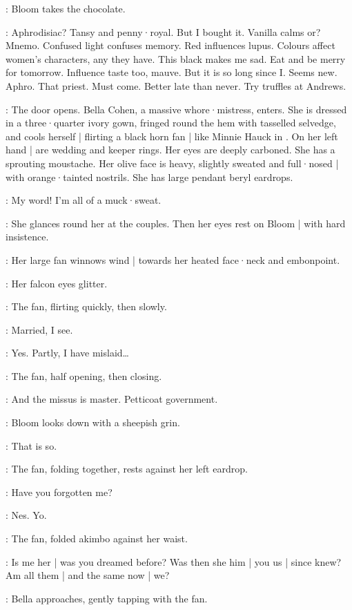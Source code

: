 :
Bloom takes the chocolate.

\Bloom:
Aphrodisiac?
Tansy and penny·royal.
But I bought it.
Vanilla calms or?
Mnemo.
Confused light confuses memory.
Red influences lupus.
Colours affect women's characters,
any they have.
This black makes me sad.
Eat and be merry for tomorrow.
Influence taste too,
mauve.
But it is so long since I\@.
Seems new.
Aphro.
That priest.
%
Must come.
Better late than never.
Try truffles at Andrews.

:
The door opens.
Bella Cohen,
a massive whore·mistress,
enters.
She is dressed in a three·quarter ivory gown,
fringed round the hem with tasselled selvedge,
and cools herself |
flirting a black horn fan |
like Minnie Hauck in .
On her left hand |
are wedding and keeper rings.
Her eyes are deeply carboned.
She has a sprouting moustache.
Her olive face is heavy,
slightly sweated and full·nosed |
with orange·tainted nostrils.
She has large pendant beryl eardrops.

\Bella:
My word!
%
I'm all of a muck·sweat.

:
She glances round her at the couples.
Then her eyes rest on Bloom |
with hard insistence.

:
Her large fan winnows wind |
towards her heated face·neck and embonpoint.

:
Her falcon eyes glitter.

:
The fan,
flirting quickly,
then slowly.

\Fan:
Married,
I see.

\Bloom:
Yes.
Partly,
I have mislaid…

:
The fan,
half opening,
then closing.

\Fan:
And the missus is master.
Petticoat government.%

:
Bloom looks down with a sheepish grin.

\Bloom:
That is so.

:
The fan,
folding together,
rests against her left eardrop.

\Fan:
Have you forgotten me?

\Bloom:
Nes.
Yo.

:
The fan,
folded akimbo against her waist.

\Fan:
Is me her |
was you dreamed before?
Was then she him |
you us |
since knew?
Am all them |
and the same now |
we?

:
Bella approaches,
%
gently tapping with the fan.


